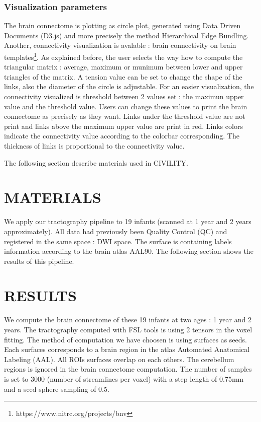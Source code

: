 \documentclass[]{spie}  %
\begin{document}
\subsubsection{Visualization parameters}

The brain connectome is plotting as circle plot, generated using Data Driven Documents (D3.js) and more precisely the method Hierarchical Edge Bundling. Another, connectivity visualization is avalable : brain connectivity on brain templates\footnote{https://www.nitrc.org/projects/bnv}.
As explained before, the user selects the way how to compute the triangular matrix : average, maximum or munimum between lower and upper triangles of the matrix. 
A tension value can be set to change the shape of the links, also the diameter of the circle is adjustable.
For an easier visualization, the connectivity visualized is threshold between 2 values set : the maximun upper value and the threshold value. Users can change these values to print the brain connectome as precisely as they want. Links under the threshold value are not print and links above the maximum upper value are print in red. 
Links colors  indicate the connectivity value according to the colorbar corresponding. The thickness of links is proportional to the connectivity value.

The following section describe materials used in CIVILITY.

\section{MATERIALS}

We apply our tractography pipeline to 19 infants (scanned at 1 year and 2 years approximately).
All data had previously been Quality Control (QC) and registered in the same space : DWI space. The surface is containing labels information according to the brain atlas AAL90. 
The following section shows the results of this pipeline. 

\section{RESULTS} 

We compute the brain connectome of these 19 infants at two ages : 1 year and 2 years. The tractography computed with FSL tools is using 2 tensors in the voxel fitting. The method of computation we have choosen is using surfaces as seeds. Each surfaces corresponds to a brain region in the atlas Automated Anatomical Labeling (AAL). All ROIs surfaces overlap on each others. The cerebellum regions is ignored in the brain connectome computation. The number of samples is set to 3000 (number of streamlines per voxel) with a step length of 0.75mm and a seed sphere sampling of 0.5. 
\end{document}
